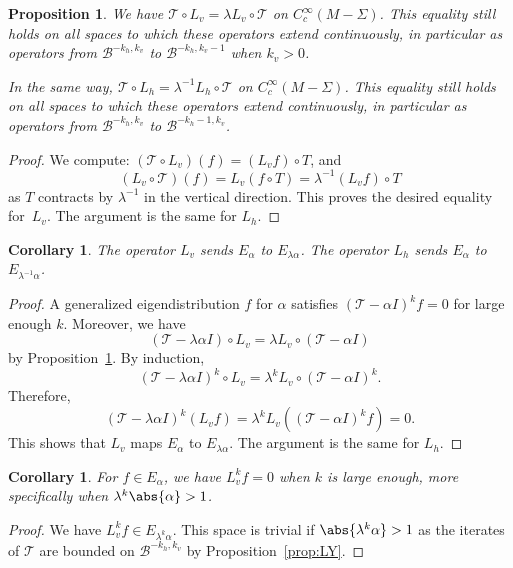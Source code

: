 \documentclass[JEP,XML,SOM,Unicode]{cedram}
\newcommand{\boB}{\mathcal{B}}
\newcommand{\boT}{\mathcal{T}}
\newtheorem{prop}[thm]{Proposition}
\newtheorem{cor}[thm]{Corollary}
\theoremstyle{definition}
\numberwithin{equation}{section}
\begin{document}
\begin{prop}
\label{prop:action_Lv} We have $\boT \circ L_v = \lambda L_v \circ \boT$ on
$C^\infty_c(M-\Sigma)$. This equality still holds on all spaces to which
these operators extend continuously, in particular as operators from
$\boB^{-k_h, k_v}$ to $\boB^{-k_h, k_v-1}$ when $k_v>0$.

In the same way, $\boT \circ L_h = \lambda^{-1} L_h \circ \boT$ on
$C^\infty_c(M-\Sigma)$. This equality still holds on all spaces to which
these operators extend continuously, in particular as operators from
$\boB^{-k_h, k_v}$ to $\boB^{-k_h-1, k_v}$.
\end{prop}
\begin{proof}
We compute: $(\boT \circ L_v)(f) = (L_v f) \circ T$, and 
\[
(L_v \circ \boT)(f)
= L_v (f \circ T) = \lambda^{-1} (L_v f)\circ T
\]
as $T$ contracts by
$\lambda^{-1}$ in the vertical direction. This proves the desired equality
for~$L_v$. The argument is the same for $L_h$.
\end{proof}

\begin{cor}
\label{cor:Lu_Ls_Erho} The operator $L_v$ sends $E_\alpha$ to
$E_{\lambda\alpha}$. The operator $L_h$ sends $E_\alpha$ to
$E_{\lambda^{-1}\alpha}$.
\end{cor}
\begin{proof}
A generalized eigendistribution $f$ for $\alpha$ satisfies $(\boT-\alpha I)^k
f= 0$ for large enough $k$. Moreover, we have
\[
(\boT -\lambda \alpha I) \circ
L_v = \lambda L_v \circ (\boT - \alpha I)
\]
by
Proposition~\ref{prop:action_Lv}. By induction,
\[
(\boT -\lambda \alpha I)^k
\circ L_v = \lambda^k L_v \circ (\boT-\alpha I)^k.
\]
Therefore,
\[
(\boT
-\lambda \alpha I)^k (L_v f) = \lambda^k L_v ( (\boT-\alpha I)^k f) = 0.
\]
This shows that $L_v$ maps $E_\alpha$ to $E_{\lambda \alpha}$. The argument
is the same for $L_h$.
\end{proof}

\begin{cor}
\label{cor:iter_Lv_0} For $f \in E_\alpha$, we have $L_v^k f = 0$ when $k$ is
large enough, more specifically when $\lambda^k \abs{\alpha}>1$.
\end{cor}
\begin{proof}
We have $L_v^k f \in E_{\lambda^k \alpha}$. This space is trivial if
$\abs{\lambda^k \alpha}>1$ as the iterates of $\boT$ are bounded on
$\boB^{-k_h, k_v}$ by Proposition~\ref{prop:LY}.
\end{proof}
\end{document}
